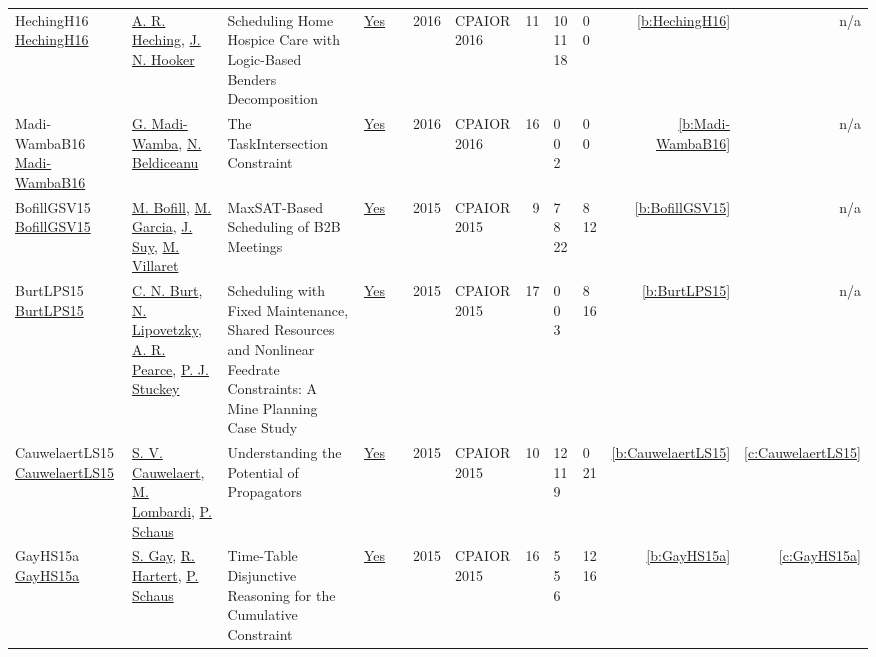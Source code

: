 {\begin{longtable}{>{\raggedright\arraybackslash}p{3cm}>{\raggedright\arraybackslash}p{4.5cm}>{\raggedright\arraybackslash}p{6.0cm}rrrp{2.5cm}rp{1cm}p{1cm}rr}
HechingH16 \href{https://doi.org/10.1007/978-3-319-33954-2_14}{HechingH16} & \hyperref[auth:a319]{A. R. Heching}, \hyperref[auth:a160]{J. N. Hooker} & Scheduling Home Hospice Care with Logic-Based Benders Decomposition & \href{../works/HechingH16.pdf}{Yes} & \cite{HechingH16} & 2016 & CPAIOR 2016 & 11 & 10 11 18 & 0 0 & \ref{b:HechingH16} & n/a\\
Madi-WambaB16 \href{https://doi.org/10.1007/978-3-319-33954-2_18}{Madi-WambaB16} & \hyperref[auth:a320]{G. Madi-Wamba}, \hyperref[auth:a128]{N. Beldiceanu} & The TaskIntersection Constraint & \href{../works/Madi-WambaB16.pdf}{Yes} & \cite{Madi-WambaB16} & 2016 & CPAIOR 2016 & 16 & 0 0 2 & 0 0 & \ref{b:Madi-WambaB16} & n/a\\
BofillGSV15 \href{https://doi.org/10.1007/978-3-319-18008-3_5}{BofillGSV15} & \hyperref[auth:a228]{M. Bofill}, \hyperref[auth:a230]{M. Garcia}, \hyperref[auth:a232]{J. Suy}, \hyperref[auth:a233]{M. Villaret} & \cellcolor{green!10}MaxSAT-Based Scheduling of {B2B} Meetings & \href{../works/BofillGSV15.pdf}{Yes} & \cite{BofillGSV15} & 2015 & CPAIOR 2015 & 9 & 7 8 22 & 8 12 & \ref{b:BofillGSV15} & n/a\\
BurtLPS15 \href{https://doi.org/10.1007/978-3-319-18008-3_7}{BurtLPS15} & \hyperref[auth:a322]{C. N. Burt}, \hyperref[auth:a323]{N. Lipovetzky}, \hyperref[auth:a324]{A. R. Pearce}, \hyperref[auth:a125]{P. J. Stuckey} & \cellcolor{green!10}Scheduling with Fixed Maintenance, Shared Resources and Nonlinear Feedrate Constraints: {A} Mine Planning Case Study & \href{../works/BurtLPS15.pdf}{Yes} & \cite{BurtLPS15} & 2015 & CPAIOR 2015 & 17 & 0 0 3 & 8 16 & \ref{b:BurtLPS15} & n/a\\
CauwelaertLS15 \href{https://doi.org/10.1007/978-3-319-18008-3_29}{CauwelaertLS15} & \hyperref[auth:a201]{S. V. Cauwelaert}, \hyperref[auth:a142]{M. Lombardi}, \hyperref[auth:a147]{P. Schaus} & \cellcolor{green!10}Understanding the Potential of Propagators & \href{../works/CauwelaertLS15.pdf}{Yes} & \cite{CauwelaertLS15} & 2015 & CPAIOR 2015 & 10 & 12 11 9 & 0 21 & \ref{b:CauwelaertLS15} & \ref{c:CauwelaertLS15}\\
GayHS15a \href{https://doi.org/10.1007/978-3-319-18008-3_11}{GayHS15a} & \hyperref[auth:a211]{S. Gay}, \hyperref[auth:a212]{R. Hartert}, \hyperref[auth:a147]{P. Schaus} & \cellcolor{green!10}Time-Table Disjunctive Reasoning for the Cumulative Constraint & \href{../works/GayHS15a.pdf}{Yes} & \cite{GayHS15a} & 2015 & CPAIOR 2015 & 16 & 5 5 6 & 12 16 & \ref{b:GayHS15a} & \ref{c:GayHS15a}\\

\end{longtable}}
